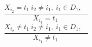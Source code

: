 $$\frac{X_{i_{2}}=t_{1}~i_{2} \neq i_{1},~i_{1} \in D_{1},~~~~}{X_{i_{1}}=t_{1}~}$$ $$\frac{X_{i_{2}} \neq t_{1}~i_{2} \neq i_{1},~i_{1} \in D_{1},~~~~}{X_{i_{1}} \neq t_{1}~}$$ 
